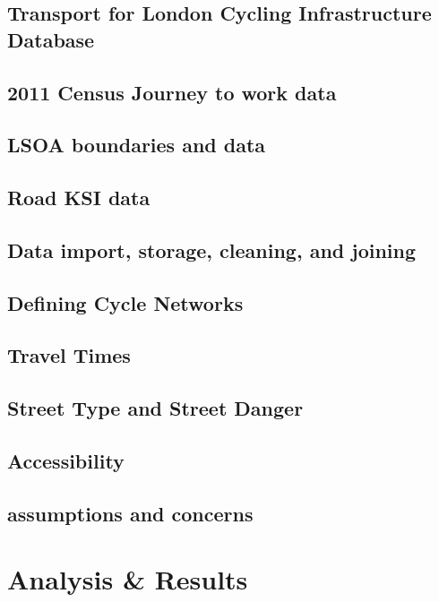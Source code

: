 \documentclass[11pt]{article} %
\begin{document}
\subsection{Transport for London Cycling Infrastructure Database}

\subsection{2011 Census Journey to work data}

\subsection{LSOA boundaries and data}

\subsection{Road KSI data}

\subsection{Data import, storage, cleaning, and joining}

\subsection{Defining Cycle Networks}

\subsection{Travel Times}

\subsection{Street Type and Street Danger}

\subsection{Accessibility}

\subsection{assumptions and concerns}

\section{Analysis \& Results}
\end{document}
